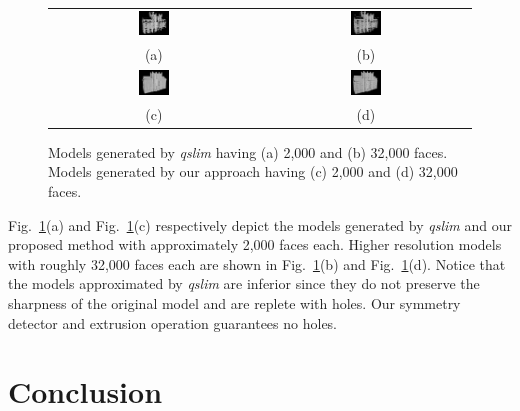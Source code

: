 \documentclass[10pt,twocolumn,letterpaper]{article}
\newcommand{\Figa}[1]{Fig.~\ref{fig:#1}(a)}
\newcommand{\Figb}[1]{Fig.~\ref{fig:#1}(b)}
\newcommand{\Figc}[1]{Fig.~\ref{fig:#1}(c)}
\newcommand{\Figd}[1]{Fig.~\ref{fig:#1}(d)}
\begin{document}
\begin{figure}[htbp]
\begin{center}
\begin{tabular}{cc}
\includegraphics[width=0.15\textwidth]{comp_32_2_qslim.png} &
\includegraphics[width=0.15\textwidth]{comp_4_2_qslim.png} \\
(a) & (b) \\
\includegraphics[width=0.15\textwidth]{comp_32_2.png} &
\includegraphics[width=0.15\textwidth]{comp_4_2.png} \\
(c) & (d)
\end{tabular}
\end{center}
\caption{
Models generated by {\it qslim} having (a) 2,000 and (b) 32,000 faces.
Models generated by our approach having (c) 2,000 and (d) 32,000 faces.}
\label{fig:TH_comp}
\end{figure}

\Figa{TH_comp} and \Figc{TH_comp} respectively depict the models generated
by {\it qslim} and our proposed method with approximately 2,000 faces each.
Higher resolution models with roughly 32,000 faces each are shown in
\Figb{TH_comp} and \Figd{TH_comp}.
Notice that the models approximated by {\it qslim} are inferior since they
do not preserve the sharpness of the original model and are replete with
holes. Our symmetry detector and extrusion operation guarantees no holes.

\section{Conclusion}
\end{document}
